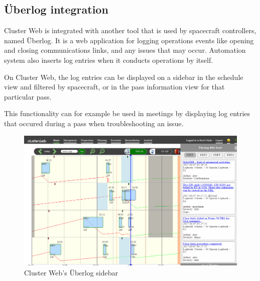  \subsection{Überlog integration}
 Cluster Web is integrated with another tool that is used by spacecraft controllers, named Überlog. It is a web application for logging operations events like opening and closing communications links, and any issues that may occur. Automation system also inserts log entries when it conducts operations by itself.
 
 On Cluster Web, the log entries can be displayed on a sidebar in the schedule view and filtered by spacecraft, or in the pass information view for that particular pass.
 
 This functionality can for example be used in meetings by displaying log entries that occured during a pass when troubleshooting an issue.
 
\begin{figure}[ht]
  \begin{center}
    \includegraphics*[width=1\textwidth]{clusterweb_uberlog}
  \end{center}
  \caption{Cluster Web's Überlog sidebar}
  \label{fig:clusterweb_uberlog}
\end{figure}
